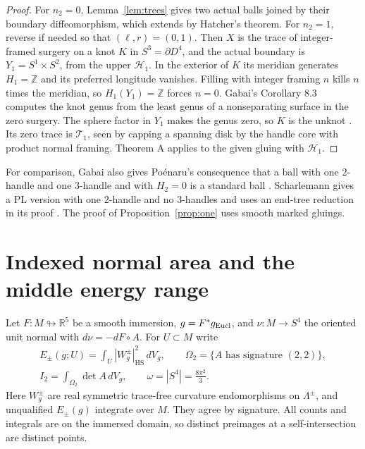 \documentclass[11pt,letterpaper]{article}
\numberwithin{equation}{section}
\newcommand{\HB}[1]{\mathcal H_{#1}}
\newcommand{\TB}[1]{\mathcal T_{#1}}
\begin{document}
\begin{proof}
For \(n_2=0\), Lemma~\ref{lem:trees} gives two actual balls joined
by their boundary diffeomorphism, which extends by Hatcher's theorem.
For \(n_2=1\), reverse if needed so that \((\ell,r)=(0,1)\).
Then \(X\) is the trace of integer-framed surgery on a knot \(K\) in
\(S^3=\partial D^4\), and the actual boundary is
\(Y_1=S^1\times S^2\), from the upper \(\HB{1}\).
In the exterior of \(K\) its meridian generates \(H_1=\mathbb Z\)
and its preferred longitude vanishes. Filling with integer framing
\(n\) kills \(n\) times the meridian, so \(H_1(Y_1)=\mathbb Z\)
forces \(n=0\). Gabai's Corollary 8.3 computes the knot genus from
the least genus of a nonseparating surface in the zero surgery.
The sphere factor in \(Y_1\) makes the genus zero, so \(K\) is the
unknot \cite[Corollary 8.3 and Remark 8.5]{Gabai1987FoliationsIII}.
Its zero trace is \(\TB{1}\), seen by capping a spanning disk by
the handle core with product normal framing. Theorem A applies to
the given gluing with \(\HB{1}\).
\end{proof}

For comparison, Gabai also gives Po\'enaru's consequence that a
ball with one \(2\)-handle and one \(3\)-handle and with \(H_2=0\)
is a standard ball \cite[Corollary 8.6]{Gabai1987FoliationsIII}.
Scharlemann gives a PL version with one \(2\)-handle and no
\(3\)-handles and uses an end-tree reduction in its proof
\cite[Corollary~2.2 and pp.~422--423]{Scharlemann2008GeneralizedPropertyR}.
The proof of Proposition~\ref{prop:one} uses smooth marked gluings.

\section{Indexed normal area and the middle energy range}\label{sec:index}

Let \(F:M\looparrowright\mathbb R^5\) be a smooth immersion,
\(g=F^*g_{\rm Eucl}\), and \(\nu:M\to S^4\) the oriented unit normal
with \(d\nu=-dF\circ A\). For \(U\subset M\) write
\begin{gather*}
 E_\pm(g;U)=\int_U |W^\pm_g|_{\mathrm{HS}}^2\,dV_g,\qquad
 \Omega_2=\{A\text{ has signature }(2,2)\},\\
 I_2=\int_{\Omega_2}\det A\,dV_g,\qquad
 \omega=|S^4|=\frac{8\pi^2}{3}.
\end{gather*}
Here \(W^\pm_g\) are real symmetric trace-free curvature
endomorphisms on \(\Lambda^\pm\), and unqualified \(E_\pm(g)\)
integrate over \(M\). They agree by signature. All counts and
integrals are on the immersed domain, so distinct preimages at a
self-intersection are distinct points.
\end{document}
